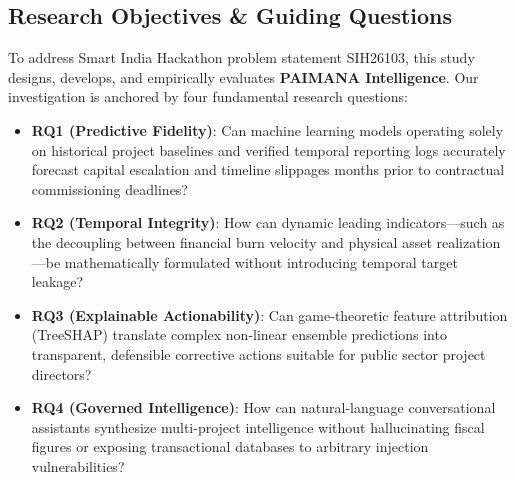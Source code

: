 \documentclass[conference]{IEEEtran}
\begin{document}
\subsection{Research Objectives \& Guiding Questions}
To address Smart India Hackathon problem statement SIH26103, this study designs, develops, and empirically evaluates \textbf{PAIMANA Intelligence}. Our investigation is anchored by four fundamental research questions:
\begin{itemize}
    \item \textbf{RQ1 (Predictive Fidelity)}: Can machine learning models operating solely on historical project baselines and verified temporal reporting logs accurately forecast capital escalation and timeline slippages months prior to contractual commissioning deadlines?
    \item \textbf{RQ2 (Temporal Integrity)}: How can dynamic leading indicators---such as the decoupling between financial burn velocity and physical asset realization---be mathematically formulated without introducing temporal target leakage?
    \item \textbf{RQ3 (Explainable Actionability)}: Can game-theoretic feature attribution (TreeSHAP) translate complex non-linear ensemble predictions into transparent, defensible corrective actions suitable for public sector project directors?
    \item \textbf{RQ4 (Governed Intelligence)}: How can natural-language conversational assistants synthesize multi-project intelligence without hallucinating fiscal figures or exposing transactional databases to arbitrary injection vulnerabilities?
\end{itemize}
\end{document}
